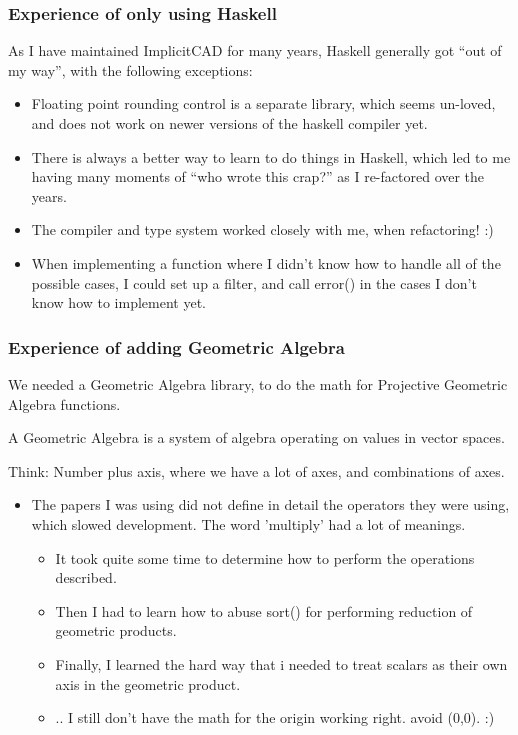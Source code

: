 \documentclass[hyperref={pdfpagemode=FullScreen},aspectratio=169]{beamer}
\begin{document}
\begin{frame}
  \frametitle{Experience of only using Haskell}
  As I have maintained ImplicitCAD for many years, Haskell generally got ``out of my way'', with the following exceptions:
  \begin{itemize}
  \item Floating point rounding control is a separate library, which seems un-loved, and does not work on newer versions of the haskell compiler yet.
  \item There is always a better way to learn to do things in Haskell, which led to me having many moments of ``who wrote this crap?'' as I re-factored over the years.
  \item The compiler and type system worked closely with me, when refactoring! :)
  \item When implementing a function where I didn't know how to handle all of the possible cases, I could set up a filter, and call error() in the cases I don't know how to implement yet.
  \end{itemize}
\end{frame}

\begin{frame}
  \frametitle{Experience of adding Geometric Algebra}
  We needed a Geometric Algebra library, to do the math for Projective Geometric Algebra functions.\par
  A Geometric Algebra is a system of algebra operating on values in vector spaces. \par
  Think: Number plus axis, where we have a lot of axes, and combinations of axes.
  \begin{itemize}
  \item The papers I was using did not define in detail the operators they were using, which slowed development. The word 'multiply' had a lot of meanings.
    \begin{itemize}
    \item It took quite some time to determine how to perform the operations described.
    \item Then I had to learn how to abuse sort() for performing reduction of geometric products.
    \item Finally, I learned the hard way that i needed to treat scalars as their own axis in the geometric product.
    \item .. I still don't have the math for the origin working right. avoid (0,0). :)
    \end{itemize}
  \end{itemize}
\end{frame}
\end{document}

